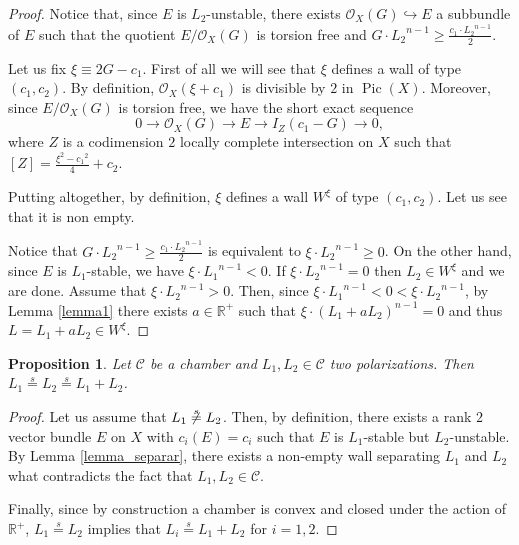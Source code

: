 \documentclass[11pt,twoside]{amsart}
\newtheorem{proposition}[theorem]{Proposition}
\theoremstyle{definition}
\newcommand{\Pic}{\operatorname{Pic}}
\begin{document}
\begin{proof}
    Notice that, since $E$ is $L_2$-unstable,  there exists $\mathcal{O}_X(G)\hookrightarrow E$ a  subbundle of $E$ such that the quotient $E/\mathcal{O}_X(G)$ is torsion free and $G\cdot {L_2}^{n-1}\geq \frac{c_1\cdot {L_2}^{n-1}}{2}$.

    Let us fix $\xi\equiv 2G-c_1$. First of all we will see that $\xi$ defines a wall of type $(c_1,c_2)$.
   By definition, $\mathcal{O}_X(\xi+c_1)$ is divisible by $2$ in $\Pic(X)$.
    Moreover, since $E/\mathcal{O}_X(G)$ is torsion free, we have the short exact sequence $$0\rightarrow \mathcal{O}_X(G)\rightarrow E\rightarrow I_Z(c_1-G)\rightarrow0,$$ where $Z$ is a codimension $2$ locally complete intersection  on $X$ such that $[Z]=\frac{\xi^2-{c_1}^2}{4}+c_2$.

Putting altogether, by definition, $\xi$ defines  a wall $W^{\xi}$ of type $(c_1,c_2)$. Let us see that it is non empty.



 Notice that $G\cdot {L_2}^{n-1}\geq \frac{c_1\cdot {L_2}^{n-1}}{2}$ is equivalent to $\xi\cdot {L_2}^{n-1}\geq0$.
 On the other hand, since $E$ is $L_1$-stable, we have $\xi\cdot {L_1}^{n-1}<0$.
 If $\xi\cdot {L_2}^{n-1}=0$ then $L_2\in W^{\xi}$ and we are done. 
 Assume that $\xi\cdot {L_2}^{n-1}>0$. Then, since $\xi\cdot {L_1}^{n-1}<0<\xi\cdot {L_2}^{n-1}$, by Lemma \ref{lemma1} there exists $a\in \mathbb{R}^+$ such that $\xi\cdot(L_1+aL_2)^{n-1}=0$ and thus $L=L_1+aL_2\in W^{\xi}$. 
\end{proof}

\begin{proposition}
\label{prop_equiv}
    Let $\mathcal{C}$ be a chamber and $L_1,L_2\in\mathcal{C}$ two polarizations. Then $L_1\overset{s}{=}L_2\overset{s}{=}L_1+L_2$.
\end{proposition}

\begin{proof}
    Let us assume that $L_1\not\overset{s}{=}L_2$. Then, by definition, there exists a rank $2$ vector bundle $E$ on $X$ with $c_i(E)=c_i$ such that $E$ is $L_1$-stable but $L_2$-unstable.  By Lemma \ref{lemma_separar}, there exists a non-empty wall separating $L_1$ and $L_2$ what contradicts the fact that $L_1,L_2\in\mathcal{C}$.

 Finally, since by construction a chamber is convex and closed under the action of $\mathbb{R}^+$,   $L_1\overset{s}{=}L_2$ implies that $L_i\overset{s}{=}L_1+L_2$ for $i=1,2$.
\end{proof}
\end{document}
